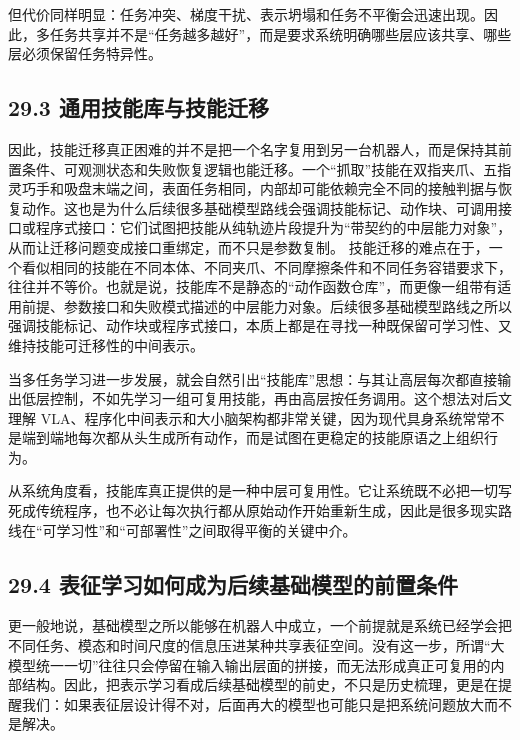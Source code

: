 但代价同样明显：任务冲突、梯度干扰、表示坍塌和任务不平衡会迅速出现。因此，多任务共享并不是“任务越多越好”，而是要求系统明确哪些层应该共享、哪些层必须保留任务特异性。

\subsection*{29.3 通用技能库与技能迁移}


因此，技能迁移真正困难的并不是把一个名字复用到另一台机器人，而是保持其前置条件、可观测状态和失败恢复逻辑也能迁移。一个“抓取”技能在双指夹爪、五指灵巧手和吸盘末端之间，表面任务相同，内部却可能依赖完全不同的接触判据与恢复动作。这也是为什么后续很多基础模型路线会强调技能标记、动作块、可调用接口或程序式接口：它们试图把技能从纯轨迹片段提升为“带契约的中层能力对象”，从而让迁移问题变成接口重绑定，而不只是参数复制。 技能迁移的难点在于，一个看似相同的技能在不同本体、不同夹爪、不同摩擦条件和不同任务容错要求下，往往并不等价。也就是说，技能库不是静态的“动作函数仓库”，而更像一组带有适用前提、参数接口和失败模式描述的中层能力对象。后续很多基础模型路线之所以强调技能标记、动作块或程序式接口，本质上都是在寻找一种既保留可学习性、又维持技能可迁移性的中间表示。

当多任务学习进一步发展，就会自然引出“技能库”思想：与其让高层每次都直接输出低层控制，不如先学习一组可复用技能，再由高层按任务调用。这个想法对后文理解 VLA、程序化中间表示和大小脑架构都非常关键，因为现代具身系统常常不是端到端地每次都从头生成所有动作，而是试图在更稳定的技能原语之上组织行为。

从系统角度看，技能库真正提供的是一种中层可复用性。它让系统既不必把一切写死成传统程序，也不必让每次执行都从原始动作开始重新生成，因此是很多现实路线在“可学习性”和“可部署性”之间取得平衡的关键中介。

\subsection*{29.4 表征学习如何成为后续基础模型的前置条件}


更一般地说，基础模型之所以能够在机器人中成立，一个前提就是系统已经学会把不同任务、模态和时间尺度的信息压进某种共享表征空间。没有这一步，所谓“大模型统一一切”往往只会停留在输入输出层面的拼接，而无法形成真正可复用的内部结构。因此，把表示学习看成后续基础模型的前史，不只是历史梳理，更是在提醒我们：如果表征层设计得不对，后面再大的模型也可能只是把系统问题放大而不是解决。

